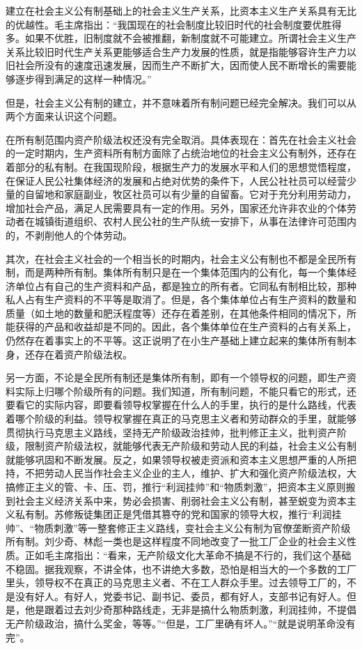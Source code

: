\documentclass{book}
\begin{document}
建立在社会主义公有制基础上的社会主义生产关系，比资本主义生产关系具有无比的优越性。毛主席指出：“我国现在的社会制度比较旧时代的社会制度要优胜得多。如果不优胜，旧制度就不会被推翻，新制度就不可能建立。所谓社会主义生产关系比较旧时代生产关系更能够适合生产力发展的性质，就是指能够容许生产力以旧社会所没有的速度迅速发展，因而生产不断扩大，因而使人民不断增长的需要能够逐步得到满足的这样一种情况。”

但是，社会主义公有制的建立，并不意味着所有制问题已经完全解决。我们可以从两个方面来认识这个问题。

在所有制范围内资产阶级法权还没有完全取消。具体表现在：首先在社会主义社会的一定时期内，生产资料所有制方面除了占统治地位的社会主义公有制外，还存在着部分的私有制。在我国现阶段，根据生产力的发展水平和人们的思想觉悟程度，在保证人民公社集体经济的发展和占绝对优势的条件下，人民公社社员可以经营少量的自留地和家庭副业，牧区社员可以有少量的自留畜。它对于充分利用劳动力，增加社会产品，满足人民需要具有一定的作用。另外，国家还允许非农业的个体劳动者在城镇街道组织、农村人民公社的生产队统一安排下，从事在法律许可范围内的，不剥削他人的个体劳动。

其次，在社会主义社会的一个相当长的时期内，社会主义公有制也不都是全民所有制，而是两种所有制。集体所有制只是在一个集体范围内的公有化，每一个集体经济单位占有自己的生产资料和产品，都是独立的所有者。它同私有制相比较，那种私人占有生产资料的不平等是取消了。但是，各个集体单位占有生产资料的数量和质量（如土地的数量和肥沃程度等）还存在着差别，在其他条件相同的情况下，所能获得的产品和收益却是不同的。因此，各个集体单位在生产资料的占有关系上，仍然存在着事实上的不平等。这正说明了在小生产基础上建立起来的集体所有制本身，还存在着资产阶级法权。

另一方面，不论是全民所有制还是集体所有制，即有一个领导权的问题，即生产资料实际上归哪个阶级所有的问题。我们知道，所有制问题，不能只看它的形式，还要看它的实际内容，即要看领导权掌握在什么人的手里，执行的是什么路线，代表着哪个阶级的利益。领导权掌握在真正的马克思主义者和劳动群众的手里，就能够贯彻执行马克思主义路线，坚持无产阶级政治挂帅，批判修正主义，批判资产阶级，限制资产阶级法权，就能够代表无产阶级和劳动人民的利益，社会主义公有制就能够巩固和不断发展。反之，如果领导权被走资派和资本主义思想严重的人所把持，不把劳动人民当作社会主义企业的主人，维护、扩大和强化资产阶级法权，大搞修正主义的管、卡、压、罚，推行“利润挂帅”和“物质刺激”，把资本主义原则搬到社会主义经济关系中来，势必会损害、削弱社会主义公有制，甚至蜕变为资本主义私有制。苏修叛徒集团正是凭借其篡夺的党和国家的领导大权，推行“利润挂帅”、“物质刺激”等一整套修正主义路线，变社会主义公有制为官僚垄断资产阶级所有制。刘少奇、林彪一类也是这样程度不同地改变了一批工厂企业的社会主义性质。正如毛主席指出：“看来，无产阶级文化大革命不搞是不行的，我们这个基础不稳固。据我观察，不讲全体，也不讲绝大多数，恐怕是相当大的一个多数的工厂里头，领导权不在真正的马克思主义者、不在工人群众手里。过去领导工厂的，不是没有好人。有好人，党委书记、副书记、委员，都有好人，支部书记有好人。但是，他是跟着过去刘少奇那种路线走，无非是搞什么物质刺激，利润挂帅，不提倡无产阶级政治，搞什么奖金，等等。”“但是，工厂里确有坏人。”“就是说明革命没有完”。
\end{document}
